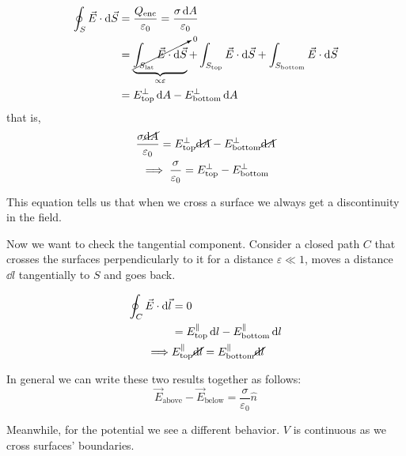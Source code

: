 \documentclass[12pt]{extarticle}
\begin{document}
\begin{align}
    \oint_S \vec E \cdot \dd{\vec S} & = \frac{Q_\text{enc}}{\varepsilon_0} = \frac{\sigma \dd{A}}{\varepsilon_0}                                                                                                                          \\
                                     & = \underbrace{\cancelto{{}_0}{\int_{S_\text{lat}} \vec E \cdot \dd{\vec S}}}_{\propto \varepsilon} + \int_{S_\text{top}} \vec E \cdot \dd{\vec S} + \int_{S_\text{bottom}} \vec E \cdot \dd{\vec S} \\
                                     & = E_\text{top}^\perp \dd{A} - E_\text{bottom}^\perp \dd{A}
\end{align}
that is,
\begin{gather}
    \frac{\sigma \cancel{\dd{A}}}{\varepsilon_0} = E_\text{top}^\perp \cancel{\dd{A}} - E_\text{bottom}^\perp \cancel{\dd{A}}\\
    \implies \frac{\sigma}{\varepsilon_0} = E_\text{top}^\perp - E_\text{bottom}^\perp
\end{gather}

This equation tells us that when we cross a surface we always get a discontinuity in the field.

Now we want to check the tangential component.
Consider a closed path $C$ that crosses the surfaces perpendicularly to it for a distance $\varepsilon \ll 1$, moves a distance $\dd{l}$ tangentially to $S$ and goes back.

\begin{align}
    \oint_C \vec E \cdot \dd{\vec l} & = 0                                                                                \\
                                     & = E_\text{top}^\parallel \dd{l} - E_\text{bottom}^\parallel \dd{l}                 \\
    \implies                         & E_\text{top}^\parallel \cancel{\dd{l}} = E_\text{bottom}^\parallel \cancel{\dd{l}}
\end{align}

In general we can write these two results together as follows:
\begin{equation}
    \label{eq:electric-boundary-condition}
    \vec E_\text{above} - \vec E_\text{below} = \frac{\sigma}{\varepsilon_0} \hat n
\end{equation}

Meanwhile, for the potential we see a different behavior. $V$ is continuous as we cross surfaces' boundaries.
\end{document}
